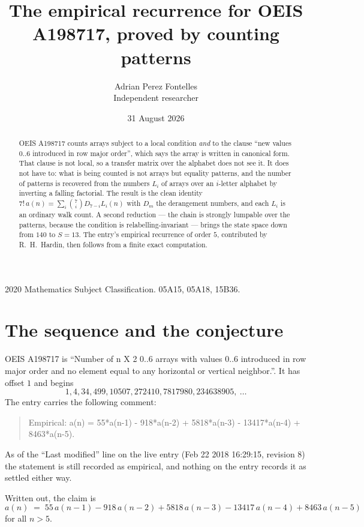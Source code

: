 \documentclass[11pt,a4paper]{article}
\title{The empirical recurrence for OEIS A198717, proved by counting patterns}
\author{Adrian Perez Fontelles\\ \small Independent researcher}
\date{31 August 2026}
\theoremstyle{plain}
\theoremstyle{definition}
\begin{document}
\maketitle

\begin{abstract}
OEIS A198717 counts arrays subject to a local condition \emph{and} to the clause ``new values
$0..6$ introduced in row major order'', which says the array is written in canonical
form. That clause is not local, so a transfer matrix over the alphabet does not see it. It
does not have to: what is being counted is not arrays but equality patterns, and the number
of patterns is recovered from the numbers $L_i$ of arrays over an $i$-letter alphabet by
inverting a falling factorial. The result is the clean identity
$7!\,a(n)=\sum_i\binom{7}{i}D_{7-i}L_i(n)$ with $D_m$ the derangement numbers,
and each $L_i$ is an ordinary walk count. A second reduction --- the chain is strongly
lumpable over the patterns, because the condition is relabelling-invariant --- brings the
state space down from $140$ to $S=13$. The entry's empirical recurrence of order
$5$, contributed by R.~H.~Hardin, then follows from a finite exact computation.
\end{abstract}

\noindent\small 2020 Mathematics Subject Classification. 05A15, 05A18, 15B36.\normalsize

\section{The sequence and the conjecture}

OEIS A198717 is ``Number of n X 2 0..6 arrays with values 0..6 introduced in row major order and no element equal to any horizontal or vertical neighbor.''. It has offset $1$ and begins
\[
1, 4, 34, 499, 10507, 272410, 7817980, 234638905,\ \dots
\]
The entry carries the following comment:
\begin{quote}\small
Empirical: a(n) = 55*a(n-1) - 918*a(n-2) + 5818*a(n-3) - 13417*a(n-4) + 8463*a(n-5).
\end{quote}
As of the ``Last modified'' line on the live entry (Feb 22 2018 16:29:15, revision 8) the statement is
still recorded as empirical, and nothing on the entry records it as settled either way.

Written out, the claim is
\begin{equation}\label{eq:conj}
a(n)\;=\;55\,a(n-1) - 918\,a(n-2) + 5818\,a(n-3) - 13417\,a(n-4) + 8463\,a(n-5)
\end{equation}
for all $n>5$.
\end{document}
